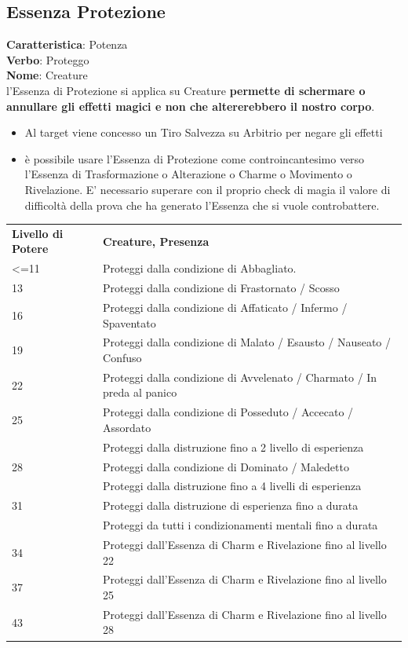 \documentclass[a4paper,11pt,twoside,openany]{book}
\begin{document}
\pagebreak

\subsection{Essenza Protezione}

\label{essenza-protezione---potenza}

\textbf{Caratteristica}: Potenza\\
\textbf{Verbo}: Proteggo\\
\textbf{Nome}: Creature\\

l'Essenza di Protezione si applica su Creature \textbf{permette di schermare o annullare gli effetti magici e non che altererebbero il nostro corpo}.

\begin{itemize}
	\item
	      Al target viene concesso un Tiro Salvezza su Arbitrio per negare gli effetti
	\item
	      è possibile usare l'Essenza di Protezione come controincantesimo verso l'Essenza di Trasformazione o Alterazione o Charme o Movimento o Rivelazione. E' necessario superare con il proprio check di magia il valore di difficoltà della prova che ha generato l'Essenza che si vuole controbattere.
\end{itemize}

\bigskip

\begin{tabularx}{0.95\textwidth}{lX}
	\toprule
	\textbf{Livello di Potere} & \textbf{Creature, Presenza}\\
	\textless=11& Proteggi dalla condizione di Abbagliato.\\
	13& Proteggi dalla condizione di Frastornato / Scosso\\
	16& Proteggi dalla condizione di Affaticato / Infermo / Spaventato\\
	19& Proteggi dalla condizione di Malato / Esausto / Nauseato / Confuso\\
	22& Proteggi dalla condizione di Avvelenato / Charmato / In preda al panico\\
	25& Proteggi dalla condizione di Posseduto / Accecato / Assordato \\
	  & Proteggi dalla distruzione fino a 2 livello di esperienza   \\
	28& Proteggi dalla condizione di Dominato / Maledetto   \\
	  & Proteggi dalla distruzione fino a 4 livelli di esperienza   \\
	31& Proteggi dalla distruzione di esperienza fino a durata   \\
	  & Proteggi da tutti i condizionamenti mentali fino a durata\\
	34& Proteggi dall'Essenza di Charm e Rivelazione fino al livello 22\\
	37& Proteggi dall'Essenza di Charm e Rivelazione fino al livello 25\\
	43& Proteggi dall'Essenza di Charm e Rivelazione fino al livello 28\\
\end{tabularx}
\end{document}
